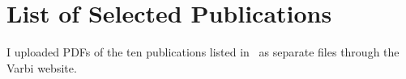 \chapter{List of Selected Publications}

I uploaded PDFs of the ten publications listed in~ as separate files through the Varbi website.
